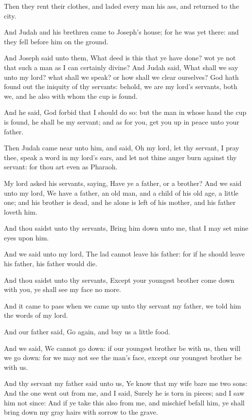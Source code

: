 \Verse Then they rent their clothes, and laded every man his ass, and returned to the city.

\Verse And Judah and his brethren came to Joseph's house; for he was yet there: and they fell before him on the ground.

\Verse And Joseph said unto them, What deed is this that ye have done?  wot ye not that such a man as I can certainly divine?  \Verse And Judah said, What shall we say unto my lord? what shall we speak?  or how shall we clear ourselves? God hath found out the iniquity of thy servants: behold, we are my lord's servants, both we, and he also with whom the cup is found.

\Verse And he said, God forbid that I should do so: but the man in whose hand the cup is found, he shall be my servant; and as for you, get you up in peace unto your father.

\Verse Then Judah came near unto him, and said, Oh my lord, let thy servant, I pray thee, speak a word in my lord's ears, and let not thine anger burn against thy servant: for thou art even as Pharaoh.

\Verse My lord asked his servants, saying, Have ye a father, or a brother?  \Verse And we said unto my lord, We have a father, an old man, and a child of his old age, a little one; and his brother is dead, and he alone is left of his mother, and his father loveth him.

\Verse And thou saidst unto thy servants, Bring him down unto me, that I may set mine eyes upon him.

\Verse And we said unto my lord, The lad cannot leave his father: for if he should leave his father, his father would die.

\Verse And thou saidst unto thy servants, Except your youngest brother come down with you, ye shall see my face no more.

\Verse And it came to pass when we came up unto thy servant my father, we told him the words of my lord.

\Verse And our father said, Go again, and buy us a little food.

\Verse And we said, We cannot go down: if our youngest brother be with us, then will we go down: for we may not see the man's face, except our youngest brother be with us.

\Verse And thy servant my father said unto us, Ye know that my wife bare me two sons: \Verse And the one went out from me, and I said, Surely he is torn in pieces; and I saw him not since: \Verse And if ye take this also from me, and mischief befall him, ye shall bring down my gray hairs with sorrow to the grave.

